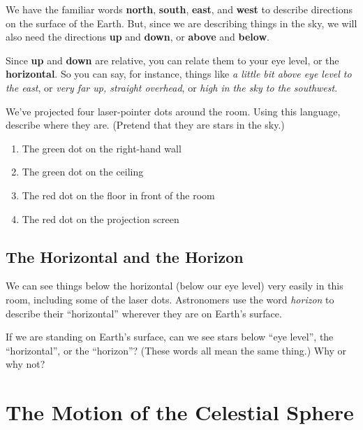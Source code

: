 \documentclass[12pt]{article}
\newcommand{\insp}{\vspace{1in}}
\newcommand{\BS}{\bigskip}
\begin{document}
	We have the familiar words {\bf north}, {\bf south}, {\bf east}, and {\bf west} to describe directions on the surface of the Earth. But, since we are describing things in the sky, we will also need the directions {\bf up} and {\bf down}, or {\bf above} and {\bf below}.
	
	Since {\bf up} and {\bf down} are relative, you can relate them to your eye level, or the {\bf horizontal}. So you can say, for instance, things like {\it a little bit above eye level to the east}, or {\it very far up, straight overhead}, or {\it high in the sky to the southwest}.
		
	We've projected four laser-pointer dots around the room. Using this language, describe where they are. (Pretend that they are stars in the sky.)
	
		
	\begin{enumerate}
		\item The green dot on the right-hand wall

\BS\BS\BS
		
		\item The green dot on the ceiling
	
\newpage

		
		\item The red dot on the floor in front of the room
\BS\BS\BS

		
		\item The red dot on the projection screen
\BS\BS\BS
		
	\end{enumerate}

\subsection{The Horizontal and the Horizon}

We can see things below the horizontal (below our eye level) very easily in this room, including some of the laser dots. Astronomers use the word {\it horizon} to describe their ``horizontal'' wherever they are on Earth's surface. 

If we are standing on Earth's surface, can we see stars below ``eye level'', the ``horizontal'', or the ``horizon''? (These words all mean the same thing.) Why or why not?

\insp



\section{The Motion of the Celestial Sphere}
\end{document}
